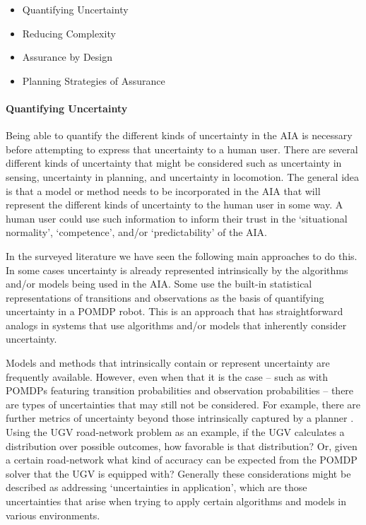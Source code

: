     \begin{itemize}
        \item Quantifying Uncertainty
        \item Reducing Complexity
        \item Assurance by Design
        \item Planning Strategies of Assurance
    \end{itemize}

    \paragraph{Quantifying Uncertainty} Being able to quantify the different kinds of uncertainty in the AIA is necessary before attempting to express that uncertainty to a human user. There are several different kinds of uncertainty that might be considered such as uncertainty in sensing, uncertainty in planning, and uncertainty in locomotion. The general idea is that a model or method needs to be incorporated in the AIA that will represent the different kinds of uncertainty to the human user in some way. A human user could use such information to inform their trust in the `situational normality', `competence', and/or `predictability' of the AIA. 

    In the surveyed literature we have seen the following main approaches to do this. In some cases uncertainty is already represented intrinsically by the algorithms and/or models being used in the AIA. Some use the built-in statistical representations of transitions and observations as the basis of quantifying uncertainty in a POMDP robot. This is an approach that has straightforward analogs in systems that use algorithms and/or models that inherently consider uncertainty.

    Models and methods that intrinsically contain or represent uncertainty are frequently available. However, even when that it is the case -- such as with POMDPs featuring transition probabilities and observation probabilities -- there are types of uncertainties that may still not be considered. For example, there are further metrics of uncertainty beyond those intrinsically captured by a planner \cite{Aitken2016-fb,Kuter2012-bv}. Using the UGV road-network problem as an example, if the UGV calculates a distribution over possible outcomes, how favorable is that distribution? Or, given a certain road-network what kind of accuracy can be expected from the POMDP solver that the UGV is equipped with? Generally these considerations might be described as addressing `uncertainties in application', which are those uncertainties that arise when trying to apply certain algorithms and models in various environments.

